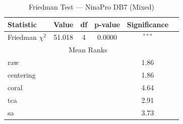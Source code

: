 \begin{table}[htbp]
\centering
\caption{Friedman Test — NinaPro DB7 (Mixed)}
\label{tab:friedman_db7}
\begin{tabular}{lccccc}
\toprule
Statistic & Value & df & p-value & Significance \\
\midrule
Friedman $\chi^2$ & 51.018 & 4 & 0.0000 & $^{***}$ \\
\midrule
\multicolumn{5}{c}{Mean Ranks} \\
\midrule
raw & & & & 1.86 \\
centering & & & & 1.86 \\
coral & & & & 4.64 \\
tca & & & & 2.91 \\
sa & & & & 3.73 \\
\bottomrule
\end{tabular}
\end{table}